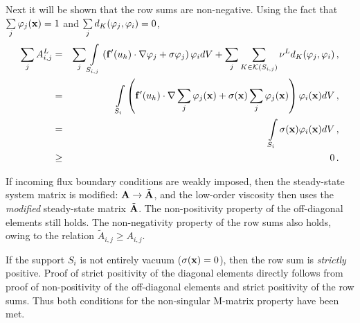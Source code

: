 \begin{prf}
Next it will be shown that the row sums are non-negative.
Using the fact that $\sum\limits_j\varphi_j(\mathbf{x})=1$ and
$\sum\limits_j d_K(\varphi_j,\varphi_i)=0$,
\begin{eqnarray*}
   \sum\limits_j A^L_{i,j} & = & \sum\limits_j \int\limits_{S_{i,j}}
      \left(\mathbf{f}'(u_h)
        \cdot\nabla\varphi_j +
      \sigma\varphi_j\right)\varphi_i dV +
      \sum\limits_j\sum\limits_{K\in\mathcal{K}(S_{i,j})}\nu^L
        d_K(\varphi_j,\varphi_i)
      \,,\\
   & = & \int\limits_{S_i}\left(
      \mathbf{f}'(u_h)\cdot
      \nabla\sum\limits_j\varphi_j(\mathbf{x}) +
      \sigma(\mathbf{x})\sum\limits_j\varphi_j(\mathbf{x})\right)
      \varphi_i(\mathbf{x}) dV \,,\\
   \label{eq:rowsum} & = & \int\limits_{S_i}\sigma(\mathbf{x})\varphi_i(\mathbf{x}) dV
     \,,\\
   & \ge & 0 \,.
\end{eqnarray*}
\begin{rmk}
  If incoming flux boundary conditions are weakly imposed, then the steady-state
  system matrix is modified: $\mathbf{A}\rightarrow\tilde{\mathbf{A}}$, and the low-order
  viscosity then uses the \emph{modified} steady-state matrix $\tilde{\mathbf{A}}$.
  The non-positivity property of the off-diagonal elements still holds.
  The non-negativity property of the row sums also holds, owing to the relation
  $\tilde{A}_{i,j} \geq A_{i,j}$.
\end{rmk}
If the support $S_i$ is not entirely vacuum ($\sigma(\mathbf{x})=0$), then the
row sum is \emph{strictly} positive.
Proof of strict positivity of the diagonal elements directly follows from proof
of non-positivity of the off-diagonal elements and strict positivity of the
row sums. Thus both conditions for the non-singular M-matrix property have
been met.

\end{prf}
